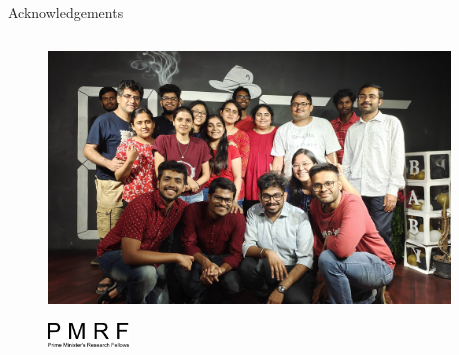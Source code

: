 \documentclass[aspectratio=169,9pt]{beamer}
\begin{document}
    \begin{frame}{Acknowledgements}
    \begin{columns}
        \begin{column}{0.65\textwidth}
        \begin{figure}
            \centering
            \includegraphics[width=\textwidth]{CSBLab}
        \end{figure}
        \begin{figure}
            \includegraphics[width=0.2\textwidth]{PMRF_Logo}
        \end{figure}
        \end{column}
        \begin{column}{0.35\textwidth}
        \end{column}
    \end{columns}

    \end{frame}

    \begin{frame}[allowframebreaks]
        \printbibliography
    \end{frame}
\end{document}
